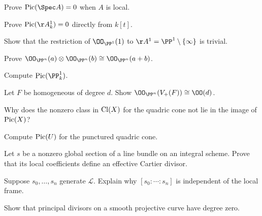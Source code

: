 \begin{exercise}\label{exr:vi42-13}
Prove \(\Pic(\Spec A)=0\) when \(A\) is local.
\end{exercise}

\begin{exercise}\label{exr:vi42-14}
Prove \(\Pic(\AA^1_k)=0\) directly from \(k[t]\).
\end{exercise}

\begin{exercise}\label{exr:vi42-15}
Show that the restriction of \(\OO_{\PP^1}(1)\) to \(\AA^1=\PP^1\setminus\{\infty\}\) is trivial.
\end{exercise}

\begin{exercise}\label{exr:vi42-16}
Prove \(\OO_{\PP^n}(a)\otimes\OO_{\PP^n}(b)\cong\OO_{\PP^n}(a+b)\).
\end{exercise}

\begin{exercise}\label{exr:vi42-17}
Compute \(\Pic(\PP^1_k)\).
\end{exercise}

\begin{exercise}\label{exr:vi42-18}
Let \(F\) be homogeneous of degree \(d\).  Show \(\OO_{\PP^n}(V_+(F))\cong\OO(d)\).
\end{exercise}

\begin{exercise}\label{exr:vi42-19}
Why does the nonzero class in \(\operatorname{Cl}(X)\) for the quadric cone not lie in the image of \(\operatorname{Pic}(X)\)?
\end{exercise}

\begin{exercise}\label{exr:vi42-20}
Compute \(\operatorname{Pic}(U)\) for the punctured quadric cone.
\end{exercise}

\begin{exercise}\label{exr:vi42-21}
Let \(s\) be a nonzero global section of a line bundle on an integral scheme.  Prove that its local coefficients define an effective Cartier divisor.
\end{exercise}

\begin{exercise}\label{exr:vi42-22}
Suppose \(s_0,\ldots,s_n\) generate \(\mathcal L\).  Explain why \([s_0:\cdots:s_n]\) is independent of the local frame.
\end{exercise}

\begin{exercise}\label{exr:vi42-23}
Show that principal divisors on a smooth projective curve have degree zero.
\end{exercise}

